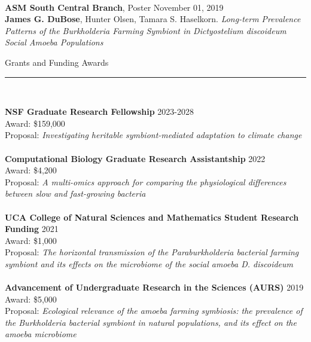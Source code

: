 \documentclass{article}
\begin{document}
\\
\textbf{ASM South Central Branch}, Poster \hfill November 01, 2019\\
\textbf{James G. DuBose}, Hunter Olsen, Tamara S. Haselkorn. \emph{Long-term Prevalence Patterns of the Burkholderia Farming Symbiont in Dictyostelium discoideum Social Amoeba Populations}
\\
\begin{flushleft}
{\Large Grants and Funding Awards} \rule{16.51cm}{0.4pt}\\
\end{flushleft}
\textbf{NSF Graduate Research Fellowship} \hfill 2023-2028\\
Award: \$159,000\\
Proposal: \emph{Investigating heritable symbiont-mediated adaptation to climate change}\\
\\
\textbf{Computational Biology Graduate Research Assistantship} \hfill 2022\\
Award: \$4,200\\
Proposal: \emph{A multi-omics approach for comparing the physiological differences between slow and fast-growing bacteria}\\
\\
\textbf{UCA College of Natural Sciences and Mathematics Student Research Funding} \hfill 2021\\
Award: \$1,000\\
Proposal: \emph{The horizontal transmission of the Paraburkholderia bacterial farming symbiont and its effects on the microbiome of the social amoeba D. discoideum}\\
\\
\textbf{Advancement of Undergraduate Research in the Sciences (AURS)} \hfill 2019\\
Award: \$5,000\\
Proposal: \emph{Ecological relevance of the amoeba farming symbiosis: the prevalence of the Burkholderia bacterial symbiont in natural populations, and its effect on the amoeba microbiome}
\\
\end{document}
